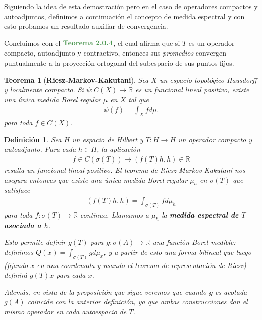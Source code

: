 \documentclass[11pt]{report}
\theoremstyle{colored}
\newtheorem{definition}{Definición}[section]
\newtheorem*{theorem*}{Teorema}
\newcommand{\R}{\mathbb{R}}
\newcommand{\ip}[1]{( #1 )}
\newcommand{\paint}[1]{\color{color}{#1}}
\newcommand{\tpaint}[1]{\paint{\textbf{#1}}}
\begin{document}
Siguiendo la idea de esta demostración pero en el caso de operadores compactos y autoadjuntos, definimos a continuación el concepto de medida espectral y con esto probamos un resultado auxiliar de convergencia. 

Concluimos con el $\tpaint{Teorema 2.0.4}$, el cual afirma que si $T$ es un operador compacto, autoadjunto y contractivo, entonces sus \textit{promedios} convergen puntualmente a la proyección ortogonal del subespacio de sus puntos fijos.
\\
\begin{tcolorbox}
\begin{theorem*}[\textbf{Riesz-Markov-Kakutani}] Sea $X$ un espacio topológico Hausdorff y localmente compacto. Si $\psi : C(X) \to \R$ es un funcional lineal positivo, existe una única medida Borel regular $\mu$ en $X$ tal que
\begin{align*}
\psi(f) = \int_X f d\mu.
\end{align*}
para toda $f \in C(X)$.
\end{theorem*}
\end{tcolorbox}

\begin{definition} Sea $H$ un espacio de Hilbert y $T : H \to H$ un operador compacto y autoadjunto. Para cada $h \in H$, la aplicación 
\begin{align*}
f \in C(\sigma(T)) \mapsto \ip{f(T)h,h} \in \R
\end{align*}
resulta un funcional lineal positivo. El teorema de Riesz-Markov-Kakutani nos asegura entonces que existe una única medida Borel regular $\mu_h$ en $\sigma(T)$ que satisface
\begin{align*}
\ip{f(T)h,h} = \int_{\sigma(T)} f d\mu_h
\end{align*}
para toda $f : \sigma(T) \to \R$ continua. Llamamos a $\mu_h$ la \textbf{medida espectral de $T$ asociada a $h$}. 

Esto permite definir $g(T)$ para $g : \sigma(A) \to \R$ una función Borel medible: definimos $Q(x) = \int_{\sigma(T)}gd\mu_x$, y a partir de esto una forma bilineal que luego (fijando $x$ en una coordenada y usando el teorema de representación de Riesz) definirá $g(T)x$ para cada $x$. 

Además, en vista de la proposición que sigue veremos que cuando $g$ es acotada $g(A)$ coincide con la anterior definición, ya que ambas construcciones dan el mismo operador en cada autoespacio de $T$.
\end{definition}
\newpage
\end{document}
